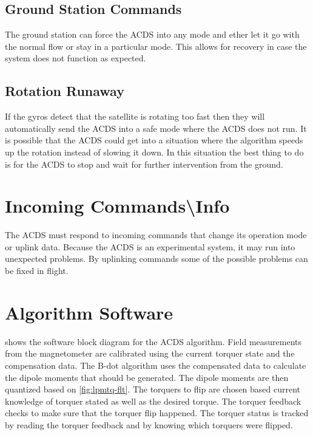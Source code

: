 \subsection{Ground Station Commands}

The ground station can force the \ac{ACDS} into any mode and ether let it go with the normal flow or stay in a particular mode. This allows for recovery in case the system does not function as expected.

\subsection{Rotation Runaway}

If the gyros detect that the satellite is rotating too fast then they will automatically send the \ac{ACDS} into a safe mode where the \ac{ACDS} does not run. It is possible that the \ac{ACDS} could get into a situation where the algorithm speeds up the rotation instead of slowing it down. In this situation the best thing to do is for the \ac{ACDS} to stop and wait for further intervention from the ground.

\section{Incoming Commands\textbackslash Info}

The \ac{ACDS} must respond to incoming commands that change its operation mode or uplink data. Because the \ac{ACDS} is an experimental system, it may run into unexpected problems. By uplinking commands some of the possible problems can be fixed in flight. 
\section{Algorithm Software}

 shows the software block diagram for the \ac{ACDS} algorithm. Field measurements from the magnetometer are calibrated using the current torquer state and the compensation data. The B-dot algorithm uses the compensated data to calculate the dipole moments that should be generated. The dipole moments are then quantized based on \cref{fig:lpmtq-flt}. The torquers to flip are chosen based current knowledge of torquer stated as well as the desired torque. The torquer feedback checks to make sure that the torquer flip happened. The torquer status is tracked by reading the torquer feedback and by knowing which torquers were flipped.

